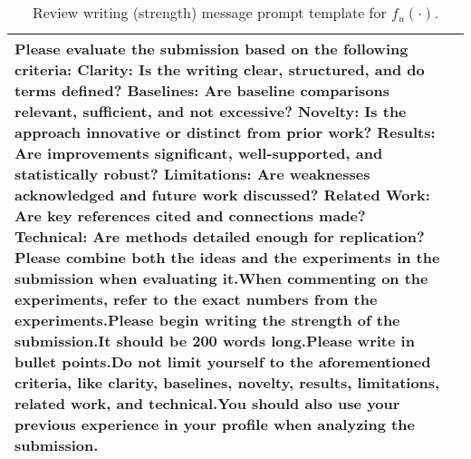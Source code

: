 \begin{table*}[htbp]
\begin{tabular}{p{1cm}p{11.5cm}}
Please evaluate the submission based on the following criteria: \newline Clarity: Is the writing clear, structured, and do terms defined? \newline Baselines: Are baseline comparisons relevant, sufficient, and not excessive? \newline Novelty: Is the approach innovative or distinct from prior work? \newline Results: Are improvements significant, well-supported, and statistically robust? \newline Limitations: Are weaknesses acknowledged and future work discussed? \newline Related Work: Are key references cited and connections made? \newline Technical: Are methods detailed enough for replication? \newline Please combine both the ideas and the experiments in the submission when evaluating it.\newline When commenting on the experiments, refer to the exact numbers from the experiments.\newline Please begin writing the strength of the submission.\newline It should be 200 words long.\newline Please write in bullet points.\newline Do not limit yourself to the aforementioned criteria, like clarity, baselines, novelty, results, limitations, related work, and technical.\newline You should also use your previous experience in your profile when analyzing the submission. \\
\bottomrule[1.5pt]
\end{tabular}
\caption{Review writing (strength) message prompt template for $f_u(\cdot)$.}
\label{tab:Agent_Review_Strength_Writing_Prompt}
\end{table*}



